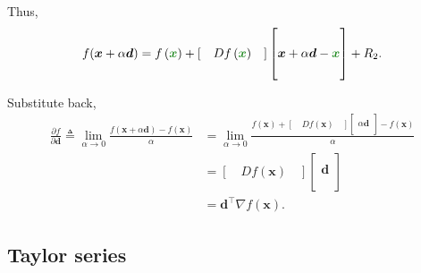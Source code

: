 \documentclass[12pt,thmsa]{article}
\begin{document}
Thus,
\[f( \boldsymbol{x}+ { \color{black}{ \alpha \boldsymbol{d}} } )=f\left( { \color{forestgreen}{\boldsymbol{x}} } \right)+\left[\quad D f\left( { \color{forestgreen}{\boldsymbol{x}} } \right) \quad\right] 
\left[\begin{aligned} \\ 
	\boldsymbol{x} + { \color{black}{ \alpha \boldsymbol{d}} } - { \color{forestgreen}{\boldsymbol{x}} } \\  \\ \end{aligned}\right]
+R_{2}.
\]

Substitute back,
\[
\begin{aligned}
	\frac{\partial f}{\partial \boldsymbol{d}} \triangleq \lim _{\alpha \rightarrow 0} \frac{f(\boldsymbol{x}+\alpha \boldsymbol{d})-f(\boldsymbol{x})}{\alpha}
	&= \lim_{\alpha \rightarrow 0 } 
	\frac{ f(\boldsymbol{x}) + \left[ \quad D f \left( \boldsymbol{x} \right) \quad \right]
		\left[ \begin{aligned} \\ \alpha \boldsymbol{d} \\ \\ \end{aligned} \right]
		- f\left( \boldsymbol{x} \right)}
	{\alpha}\\
	&=\left[\quad Df\left(\boldsymbol{x}\right)\quad\right] \left[ \begin{array}{c} \\ \boldsymbol{d}  \\ \\ \end{array} \right]\\
	&=\boldsymbol{d}^{\top} \nabla f(\boldsymbol{x}).
\end{aligned}
\]


\subsection{Taylor series}
\end{document}
